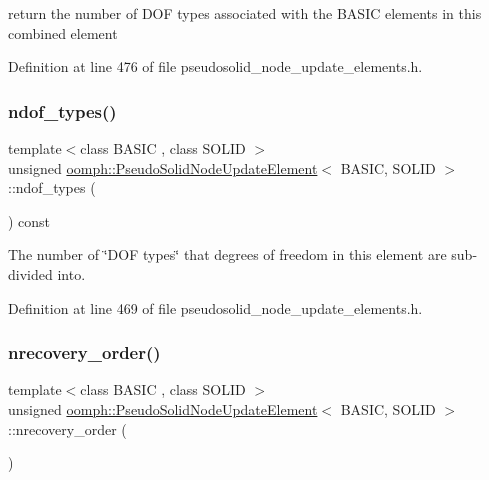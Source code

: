 return the number of D\+OF types associated with the B\+A\+S\+IC elements in this combined element 



Definition at line 476 of file pseudosolid\+\_\+node\+\_\+update\+\_\+elements.\+h.

\mbox{\label{classoomph_1_1PseudoSolidNodeUpdateElement_afc87fa6598bbabf49d872296e47bf1ea}} 
\subsubsection{\texorpdfstring{ndof\+\_\+types()}{ndof\_types()}}
{\footnotesize\ttfamily template$<$class B\+A\+S\+IC , class S\+O\+L\+ID $>$ \\
unsigned \hyperlink{classoomph_1_1PseudoSolidNodeUpdateElement}{oomph\+::\+Pseudo\+Solid\+Node\+Update\+Element}$<$ B\+A\+S\+IC, S\+O\+L\+ID $>$\+::ndof\+\_\+types (\begin{DoxyParamCaption}{ }\end{DoxyParamCaption}) const\hspace{0.3cm}{\ttfamily [inline]}}



The number of \char`\"{}\+D\+O\+F types\char`\"{} that degrees of freedom in this element are sub-\/divided into. 



Definition at line 469 of file pseudosolid\+\_\+node\+\_\+update\+\_\+elements.\+h.

\mbox{\label{classoomph_1_1PseudoSolidNodeUpdateElement_a673a5bdd155f24f333c0bb493f645202}} 
\subsubsection{\texorpdfstring{nrecovery\+\_\+order()}{nrecovery\_order()}}
{\footnotesize\ttfamily template$<$class B\+A\+S\+IC , class S\+O\+L\+ID $>$ \\
unsigned \hyperlink{classoomph_1_1PseudoSolidNodeUpdateElement}{oomph\+::\+Pseudo\+Solid\+Node\+Update\+Element}$<$ B\+A\+S\+IC, S\+O\+L\+ID $>$\+::nrecovery\+\_\+order (\begin{DoxyParamCaption}{ }\end{DoxyParamCaption})\hspace{0.3cm}{\ttfamily [inline]}}



